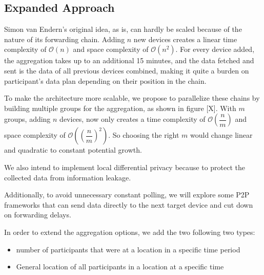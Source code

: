 \subsection{Expanded Approach}
Simon van Endern's original idea, as is, can hardly be scaled because of the nature of its forwarding chain. Adding \(n\) new devices creates a linear time complexity of \(\mathcal{O}(n)\) and space complexity of \(\mathcal{O}(n^2)\). For every device added, the aggregation takes up to an additional 15 minutes, and the data fetched and sent is the data of all previous devices combined, making it quite a burden on participant's data plan depending on their position in the chain. 

To make the architecture more scalable, we propose to parallelize these chains by building multiple groups for the aggregation, as shown in figure [X]. With \(m\) groups, adding \(n\) devices, now only creates a time complexity of \(\mathcal{O}(\dfrac{n}{m})\) and space complexity of \(\mathcal{O}((\dfrac{n}{m})^2)\). So choosing the right \(m\) would change linear and quadratic to constant potential growth. 

We also intend to implement local differential privacy because to protect the collected data from information leakage.

Additionally, to avoid unnecessary constant polling, we will explore some P2P frameworks that can send data directly to the next target device and cut down on forwarding delays.

In order to extend the aggregation options, we add the two following two types:
\begin{itemize}
    \item number of participants that were at a location in a specific time period
    \item General location of all participants in a location at a specific time
\end{itemize}

